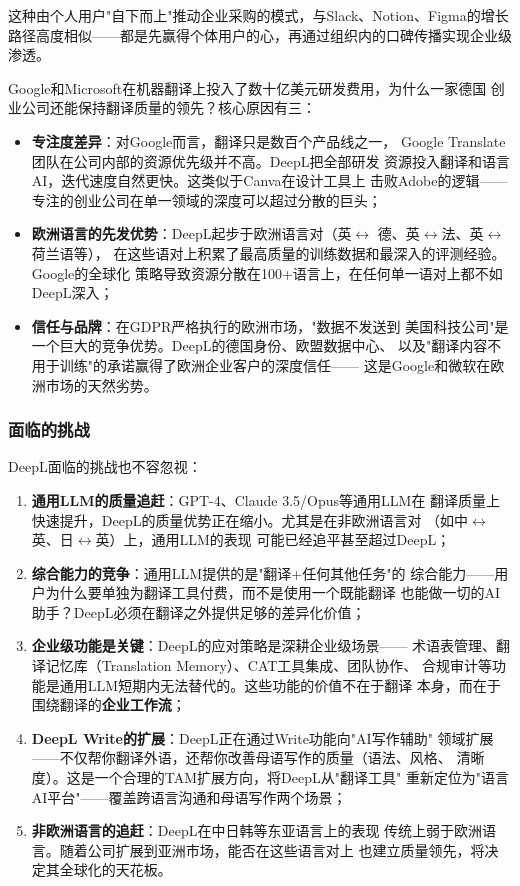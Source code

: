 这种由个人用户"自下而上"推动企业采购的模式，与Slack、Notion、Figma的增长
路径高度相似——都是先赢得个体用户的心，再通过组织内的口碑传播实现企业级
渗透。

\begin{whybox}[DeepL为什么能在巨头夹缝中生存并壮大？]
Google和Microsoft在机器翻译上投入了数十亿美元研发费用，为什么一家德国
创业公司还能保持翻译质量的领先？核心原因有三：
\begin{itemize}
  \item \textbf{专注度差异}：对Google而言，翻译只是数百个产品线之一，
    Google Translate团队在公司内部的资源优先级并不高。DeepL把全部研发
    资源投入翻译和语言AI，迭代速度自然更快。这类似于Canva在设计工具上
    击败Adobe的逻辑——专注的创业公司在单一领域的深度可以超过分散的巨头；
  \item \textbf{欧洲语言的先发优势}：DeepL起步于欧洲语言对（英$\leftrightarrow$
    德、英$\leftrightarrow$法、英$\leftrightarrow$荷兰语等），
    在这些语对上积累了最高质量的训练数据和最深入的评测经验。Google的全球化
    策略导致资源分散在100+语言上，在任何单一语对上都不如DeepL深入；
  \item \textbf{信任与品牌}：在GDPR严格执行的欧洲市场，"数据不发送到
    美国科技公司"是一个巨大的竞争优势。DeepL的德国身份、欧盟数据中心、
    以及"翻译内容不用于训练"的承诺赢得了欧洲企业客户的深度信任——
    这是Google和微软在欧洲市场的天然劣势。
\end{itemize}
\end{whybox}

\subsubsection{面临的挑战}
DeepL面临的挑战也不容忽视：

\begin{enumerate}
  \item \textbf{通用LLM的质量追赶}：GPT-4、Claude 3.5/Opus等通用LLM在
    翻译质量上快速提升，DeepL的质量优势正在缩小。尤其是在非欧洲语言对
    （如中$\leftrightarrow$英、日$\leftrightarrow$英）上，通用LLM的表现
    可能已经追平甚至超过DeepL；
  \item \textbf{综合能力的竞争}：通用LLM提供的是"翻译+任何其他任务"的
    综合能力——用户为什么要单独为翻译工具付费，而不是使用一个既能翻译
    也能做一切的AI助手？DeepL必须在翻译之外提供足够的差异化价值；
  \item \textbf{企业级功能是关键}：DeepL的应对策略是深耕企业级场景——
    术语表管理、翻译记忆库（Translation Memory）、CAT工具集成、团队协作、
    合规审计等功能是通用LLM短期内无法替代的。这些功能的价值不在于翻译
    本身，而在于围绕翻译的\textbf{企业工作流}；
  \item \textbf{DeepL Write的扩展}：DeepL正在通过Write功能向"AI写作辅助"
    领域扩展——不仅帮你翻译外语，还帮你改善母语写作的质量（语法、风格、
    清晰度）。这是一个合理的TAM扩展方向，将DeepL从"翻译工具"
    重新定位为"语言AI平台"——覆盖跨语言沟通和母语写作两个场景；
  \item \textbf{非欧洲语言的追赶}：DeepL在中日韩等东亚语言上的表现
    传统上弱于欧洲语言。随着公司扩展到亚洲市场，能否在这些语言对上
    也建立质量领先，将决定其全球化的天花板。
\end{enumerate}

